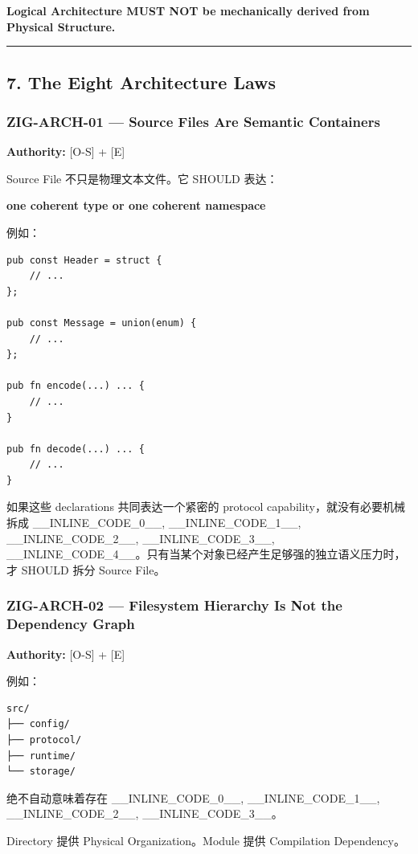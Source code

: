 \documentclass[11pt,a4paper]{article}
\begin{document}
\begin{gfmBlockquote}
\textbf{Logical Architecture MUST NOT be mechanically derived from Physical Structure.}
\end{gfmBlockquote}
\vspace{0.5em}\hrule\vspace{0.5em}
\subsection{7. The Eight Architecture Laws}
\subsubsection{ZIG-ARCH-01 — Source Files Are Semantic Containers}
\textbf{Authority:} [O-S] + [E]

Source File 不只是物理文本文件。它 SHOULD 表达：

\begin{gfmBlockquote}
\textbf{one coherent type or one coherent namespace}
\end{gfmBlockquote}
例如：

\begin{lstlisting}[language=zig]
pub const Header = struct {
    // ...
};

pub const Message = union(enum) {
    // ...
};

pub fn encode(...) ... {
    // ...
}

pub fn decode(...) ... {
    // ...
}
\end{lstlisting}
如果这些 declarations 共同表达一个紧密的 protocol capability，就没有必要机械拆成 \_\_INLINE\_CODE\_0\_\_, \_\_INLINE\_CODE\_1\_\_, \_\_INLINE\_CODE\_2\_\_, \_\_INLINE\_CODE\_3\_\_, \_\_INLINE\_CODE\_4\_\_。只有当某个对象已经产生足够强的独立语义压力时，才 SHOULD 拆分 Source File。

\subsubsection{ZIG-ARCH-02 — Filesystem Hierarchy Is Not the Dependency Graph}
\textbf{Authority:} [O-S] + [E]

例如：

\begin{lstlisting}[language=text]
src/
├── config/
├── protocol/
├── runtime/
└── storage/
\end{lstlisting}
绝不自动意味着存在 \_\_INLINE\_CODE\_0\_\_, \_\_INLINE\_CODE\_1\_\_, \_\_INLINE\_CODE\_2\_\_, \_\_INLINE\_CODE\_3\_\_。

Directory 提供 Physical Organization。Module 提供 Compilation Dependency。
\end{document}
